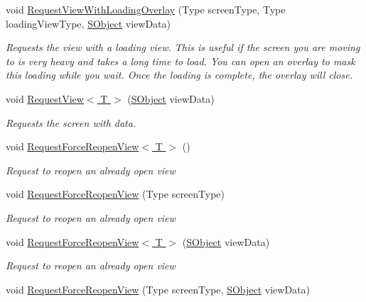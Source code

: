 \begin{DoxyCompactItemize}
void \hyperlink{class_scaffolding_1_1_view_manager_base_aa9f6af665d066471cac654181edcf4fe}{Request\+View\+With\+Loading\+Overlay} (Type screen\+Type, Type loading\+View\+Type, \hyperlink{class_scaffolding_1_1_s_object}{S\+Object} view\+Data)
\begin{DoxyCompactList}\small\item\em Requests the view with a loading view. This is useful if the screen you are moving to is very heavy and takes a long time to load. You can open an overlay to mask this loading while you wait. Once the loading is complete, the overlay will close. \end{DoxyCompactList}\item 
void \hyperlink{class_scaffolding_1_1_view_manager_base_ac1e312060187e1b0995b5944145eca4f}{Request\+View$<$ T $>$} (\hyperlink{class_scaffolding_1_1_s_object}{S\+Object} view\+Data)
\begin{DoxyCompactList}\small\item\em Requests the screen with data. \end{DoxyCompactList}\item 
void \hyperlink{class_scaffolding_1_1_view_manager_base_a5e2c66cf402ef8b9f3d8aa1162b06995}{Request\+Force\+Reopen\+View$<$ T $>$} ()
\begin{DoxyCompactList}\small\item\em Request to reopen an already open view \end{DoxyCompactList}\item 
void \hyperlink{class_scaffolding_1_1_view_manager_base_a78c0b2e1361d4962c6cea7c4b983d7ec}{Request\+Force\+Reopen\+View} (Type screen\+Type)
\begin{DoxyCompactList}\small\item\em Request to reopen an already open view \end{DoxyCompactList}\item 
void \hyperlink{class_scaffolding_1_1_view_manager_base_aa28101b866360aae9efceea950535ec6}{Request\+Force\+Reopen\+View$<$ T $>$} (\hyperlink{class_scaffolding_1_1_s_object}{S\+Object} view\+Data)
\begin{DoxyCompactList}\small\item\em Request to reopen an already open view \end{DoxyCompactList}\item 
void \hyperlink{class_scaffolding_1_1_view_manager_base_a950c3fa25288d34a615c8a9b80177b48}{Request\+Force\+Reopen\+View} (Type screen\+Type, \hyperlink{class_scaffolding_1_1_s_object}{S\+Object} view\+Data)

\end{DoxyCompactItemize}
